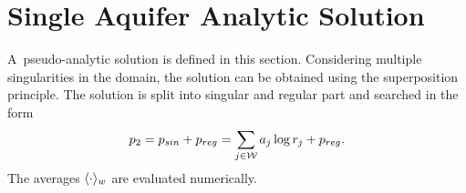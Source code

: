 % 
% 

\section{Single Aquifer Analytic Solution} \label{sec:prim_analytic_solution}
A~pseudo-analytic solution is defined in this section. Considering multiple singularities in the domain,
the solution can be obtained using the superposition principle.
The solution is split into singular and regular part and searched in the form
\begin{equation}
p_2 = p_{sin} + p_{reg} = \sum\limits_{j\in\mathcal{W}} a_j\log r_j + p_{reg}. \label{eqn:2d_press_sol_mult}\\
\end{equation}
The averages $\langle\cdot\rangle_w$ are evaluated numerically.

